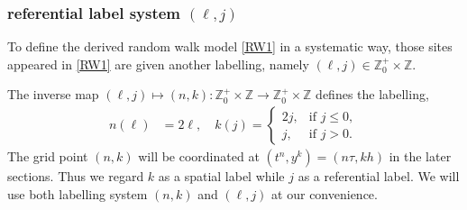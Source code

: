 \documentclass[a4paper,11pt]{article}
\def\l{{h}}
\theoremstyle{remark}
\begin{document}
\subsubsection{referential label system $(\ell,j)$}
To define the derived random walk model \eqref{RW1} in a systematic way, those sites appeared in \eqref{RW1} are given another labelling, namely $(\ell,j)\in \mathbb{Z}_0^+ \times \mathbb{Z}$.

The inverse map $(\ell,j)\mapsto (n,k): \mathbb{Z}_0^+ \times \mathbb{Z} \rightarrow \mathbb{Z}_0^+ \times \mathbb{Z}$ defines the labelling,
\begin{align*}
 n(\ell) &= 2\ell, \quad 
 k(j)  =\left\{\begin{array}{lr}
        2j, & \text{if } j\le0,\\
        j, & \text{if }  j>0.
        \end{array}\right.
\end{align*}
The grid point $(n,k)$ will be coordinated at $(t^n,y^k)=(n\tau,k\l)$ in the later sections. Thus we regard $k$ as a spatial label while $j$ as a referential label. We will use both  labelling system $(n,k)$ and $(\ell,j)$ at our convenience. %
\end{document}
